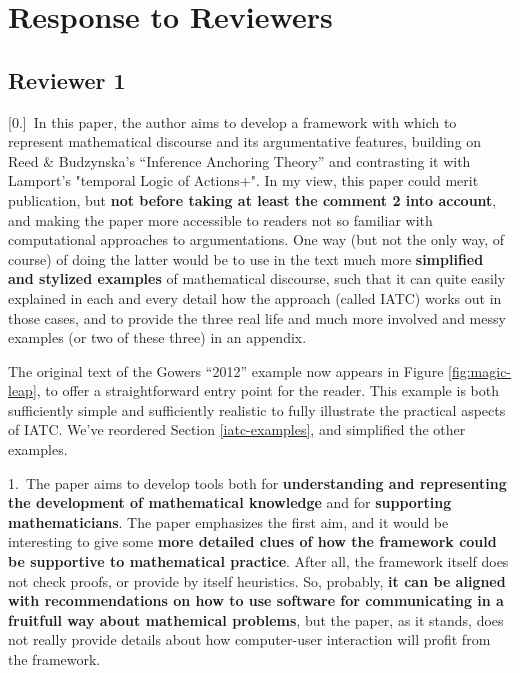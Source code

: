 \newpage
\section{Response to Reviewers}
\subsection{Reviewer 1}\label{rev1}

\begin{mdframed}[backgroundcolor=orange!10]
{[}0.{]}~In this paper, the author aims to develop a framework with which to represent mathematical discourse and its argumentative features, building on Reed \& Budzynska's ``Inference Anchoring Theory'' and contrasting it with Lamport's "temporal Logic of Actions+". In my view, this paper could merit publication, but \textbf{not before taking at least the comment 2 into account}, and making the paper more accessible to readers not so familiar with computational approaches to argumentations.  One way (but not the only way, of course) of doing the latter would be to use in the text much more \textbf{simplified and stylized examples} of mathematical discourse, such that it can quite easily explained in each and every detail how the approach (called IATC) works out in those cases, and to provide the three real life and much more involved and messy examples (or two of these three) in an appendix.
\end{mdframed}


The original text of the Gowers ``2012'' example now appears in Figure \ref{fig:magic-leap}, to offer a straightforward entry point
for the reader.  This example is both sufficiently simple and
sufficiently realistic to fully illustrate the practical aspects of IATC.
We've reordered Section \ref{iatc-examples}, and simplified
the other examples.

\begin{mdframed}[backgroundcolor=red!10]
1.~The paper aims to develop tools both for \textbf{understanding and representing the development of mathematical knowledge} and for \textbf{supporting mathematicians}. The paper emphasizes the first aim, and it would be interesting to give some \textbf{more detailed clues of how the framework could be supportive to mathematical practice}. After all, the framework itself does not check proofs, or provide by itself heuristics. So, probably, \textbf{it can be aligned with recommendations on how to use software for communicating in a fruitfull way about mathemical problems}, but the paper, as it stands, does not really provide details about how computer-user interaction will profit from the framework.
\end{mdframed}

